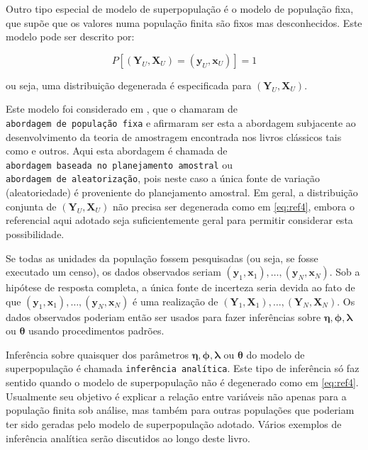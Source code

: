 \documentclass[]{book}
\theoremstyle{definition}
\theoremstyle{definition}
\theoremstyle{definition}
\theoremstyle{remark}
\begin{document}
Outro tipo especial de modelo de superpopulação é o modelo de população
fixa, que supõe que os valores numa população finita são fixos mas
desconhecidos. Este modelo pode ser descrito por:

\begin{equation}
P\left[ \left( \mathbf{Y}_U , \mathbf{X}_U \right) = \left( \mathbf{y}_U , \mathbf{x}_U \right) \right] = 1 \label{eq:ref4}
\end{equation}

ou seja, uma distribuição degenerada é especificada para
\(\left(\mathbf{Y}_U , \mathbf{X}_U \right)\).

Este modelo foi considerado em \citep{cassel}, que o chamaram de
\texttt{abordagem\ de\ população\ fixa} e afirmaram ser esta a abordagem
subjacente ao desenvolvimento da teoria de amostragem encontrada nos
livros clássicos tais como \citep{cochran} e outros. Aqui esta abordagem
é chamada de \texttt{abordagem\ baseada\ no\ planejamento\ amostral} ou
\texttt{abordagem\ de\ aleatorização}, pois neste caso a única fonte de
variação (aleatoriedade) é proveniente do planejamento amostral. Em
geral, a distribuição conjunta de
\(\left( \mathbf{Y}_U , \mathbf{X}_U \right)\) não precisa ser
degenerada como em \eqref{eq:ref4}, embora o referencial aqui adotado seja
suficientemente geral para permitir considerar esta possibilidade.

Se todas as unidades da população fossem pesquisadas (ou seja, se fosse
executado um censo), os dados observados seriam
\((\mathbf{y}_1 , \mathbf{x}_1) ,\ldots, (\mathbf{y}_N , \mathbf{x}_N)\).
Sob a hipótese de resposta completa, a única fonte de incerteza seria
devida ao fato de que
\((\mathbf{y}_1 , \mathbf{x}_1) ,\ldots, (\mathbf{y}_N , \mathbf{x}_N)\)
é uma realização de
\(\left( \mathbf{Y}_1 , \mathbf{X}_1 \right) ,\ldots, \left( \mathbf{Y}_N , \mathbf{X}_N \right)\).
Os dados observados poderiam então ser usados para fazer inferências
sobre \(\mathbf{\eta}, \mathbf{\phi},\mathbf{\lambda}\) ou
\(\mathbf{\theta}\) usando procedimentos padrões.

Inferência sobre quaisquer dos parâmetros
\(\mathbf{\eta},\mathbf{\phi},\mathbf{\lambda}\) ou \(\mathbf{\theta}\)
do modelo de superpopulação é chamada \texttt{inferência\ analítica}.
Este tipo de inferência só faz sentido quando o modelo de superpopulação
não é degenerado como em \eqref{eq:ref4}. Usualmente seu objetivo é
explicar a relação entre variáveis não apenas para a população finita
sob análise, mas também para outras populações que poderiam ter sido
geradas pelo modelo de superpopulação adotado. Vários exemplos de
inferência analítica serão discutidos ao longo deste livro.
\end{document}
